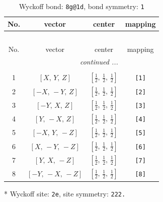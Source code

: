 \documentclass[fleqn,8pt]{jsarticle}
\begin{document}
\begin{longtable}{cccc}
\caption{Wyckoff bond: {\tt 8g@1d}, bond symmetry: {\tt 1}}
 \\
 \hline \hline
No. & vector & center & mapping \\ \hline \endfirsthead

\multicolumn{3}{l}{\tablename\ \thetable{}} \\
 \hline \hline
No. & vector & center & mapping \\ \hline \endhead

 \hline \hline
\multicolumn{3}{r}{\footnotesize\it continued ...} \\ \endfoot

 \hline \hline
\multicolumn{3}{r}{} \\ \endlastfoot

1 & $\left[ X,\, Y,\, Z \right]$ & $\left[ \frac{1}{2},\, \frac{1}{2},\, \frac{1}{2} \right]$ & {\tt [1]} \\ \hline
2 & $\left[ - X,\, - Y,\, Z \right]$ & $\left[ \frac{1}{2},\, \frac{1}{2},\, \frac{1}{2} \right]$ & {\tt [2]} \\ \hline
3 & $\left[ - Y,\, X,\, Z \right]$ & $\left[ \frac{1}{2},\, \frac{1}{2},\, \frac{1}{2} \right]$ & {\tt [3]} \\ \hline
4 & $\left[ Y,\, - X,\, Z \right]$ & $\left[ \frac{1}{2},\, \frac{1}{2},\, \frac{1}{2} \right]$ & {\tt [4]} \\ \hline
5 & $\left[ - X,\, Y,\, - Z \right]$ & $\left[ \frac{1}{2},\, \frac{1}{2},\, \frac{1}{2} \right]$ & {\tt [5]} \\ \hline
6 & $\left[ X,\, - Y,\, - Z \right]$ & $\left[ \frac{1}{2},\, \frac{1}{2},\, \frac{1}{2} \right]$ & {\tt [6]} \\ \hline
7 & $\left[ Y,\, X,\, - Z \right]$ & $\left[ \frac{1}{2},\, \frac{1}{2},\, \frac{1}{2} \right]$ & {\tt [7]} \\ \hline
8 & $\left[ - Y,\, - X,\, - Z \right]$ & $\left[ \frac{1}{2},\, \frac{1}{2},\, \frac{1}{2} \right]$ & {\tt [8]} \\
\end{longtable}
* Wyckoff site: {\tt 2e}, site symmetry: {\tt 222.}
\renewcommand{\arraystretch}{1.2}
\end{document}
